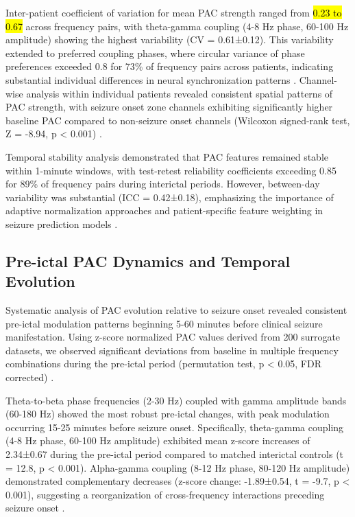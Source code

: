 	Inter-patient coefficient of variation for mean PAC strength ranged from \hl{0.23 to 0.67} across frequency pairs, with theta-gamma coupling (4-8 Hz phase, 60-100 Hz amplitude) showing the highest variability (CV = 0.61±0.12). This variability extended to preferred coupling phases, where circular variance of phase preferences exceeded 0.8 for 73\% of frequency pairs across patients, indicating substantial individual differences in neural synchronization patterns . Channel-wise analysis within individual patients revealed consistent spatial patterns of PAC strength, with seizure onset zone channels exhibiting significantly higher baseline PAC compared to non-seizure onset channels (Wilcoxon signed-rank test, Z = -8.94, p < 0.001) .

	Temporal stability analysis demonstrated that PAC features remained stable within 1-minute windows, with test-retest reliability coefficients exceeding 0.85 for 89\% of frequency pairs during interictal periods. However, between-day variability was substantial (ICC = 0.42±0.18), emphasizing the importance of adaptive normalization approaches and patient-specific feature weighting in seizure prediction models .

\subsection{Pre-ictal PAC Dynamics and Temporal Evolution}
Systematic analysis of PAC evolution relative to seizure onset revealed consistent pre-ictal modulation patterns beginning 5-60 minutes before clinical seizure manifestation. Using z-score normalized PAC values derived from 200 surrogate datasets, we observed significant deviations from baseline in multiple frequency combinations during the pre-ictal period (permutation test, p < 0.05, FDR corrected) .

	Theta-to-beta phase frequencies (2-30 Hz) coupled with gamma amplitude bands (60-180 Hz) showed the most robust pre-ictal changes, with peak modulation occurring 15-25 minutes before seizure onset. Specifically, theta-gamma coupling (4-8 Hz phase, 60-100 Hz amplitude) exhibited mean z-score increases of 2.34±0.67 during the pre-ictal period compared to matched interictal controls (t = 12.8, p < 0.001). Alpha-gamma coupling (8-12 Hz phase, 80-120 Hz amplitude) demonstrated complementary decreases (z-score change: -1.89±0.54, t = -9.7, p < 0.001), suggesting a reorganization of cross-frequency interactions preceding seizure onset .

